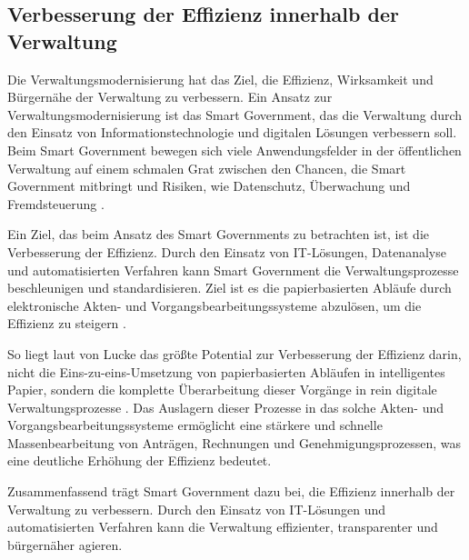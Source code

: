 \subsection{Verbesserung der Effizienz innerhalb der Verwaltung}
Die Verwaltungsmodernisierung hat das Ziel, die Effizienz, Wirksamkeit und Bürgernähe der Verwaltung zu verbessern.
Ein Ansatz zur Verwaltungsmodernisierung ist das Smart Government, das die Verwaltung durch den Einsatz von Informationstechnologie und digitalen Lösungen verbessern soll.
Beim Smart Government bewegen sich viele Anwendungsfelder in der öffentlichen Verwaltung auf einem schmalen Grat zwischen den Chancen, die Smart Government mitbringt und Risiken, wie Datenschutz, Überwachung und Fremdsteuerung \citep[Vgl.][]{Lucke2018}.
\par
Ein Ziel, das beim Ansatz des Smart Governments zu betrachten ist, ist die Verbesserung der Effizienz.
Durch den Einsatz von IT-Lösungen, Datenanalyse und automatisierten Verfahren kann Smart Government die Verwaltungsprozesse beschleunigen und standardisieren. 
Ziel ist es die papierbasierten Abläufe durch elektronische Akten- und Vorgangsbearbeitungssysteme abzulösen, um die Effizienz zu steigern \citep[][]{von_Lucke_2016}.
\par
So liegt laut von Lucke das größte Potential zur Verbesserung der Effizienz darin, nicht die Eins-zu-eins-Umsetzung von papierbasierten Abläufen in intelligentes Papier, sondern die komplette Überarbeitung dieser Vorgänge in rein digitale Verwaltungsprozesse \citep[][S.179]{von_Lucke_2016}.
Das Auslagern dieser Prozesse in das solche Akten- und Vorgangsbearbeitungssysteme ermöglicht eine stärkere und schnelle Massenbearbeitung von Anträgen, Rechnungen und Genehmigungsprozessen, was eine deutliche Erhöhung der Effizienz bedeutet.
\par
Zusammenfassend trägt Smart Government dazu bei, die Effizienz innerhalb der Verwaltung zu verbessern. 
Durch den Einsatz von IT-Lösungen und automatisierten Verfahren kann die Verwaltung effizienter, transparenter und bürgernäher agieren.